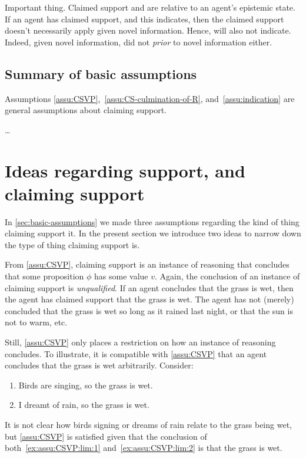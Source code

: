 \begin{note}
  \color{red}
  Important thing.
  Claimed support and  are relative to an agent's epistemic state.
  If an agent has claimed support, and this indicates, then the claimed support doesn't necessarily apply given novel information.
  Hence, will also not indicate.
  Indeed, given novel information, did not \indicateN{} \emph{prior} to novel information either.
\end{note}

\subsection{Summary of basic assumptions}
\label{sec:summary}

\begin{note}
  Assumptions \ref{assu:CSVP},~\ref{assu:CS-culmination-of-R}, and~\ref{assu:indication} are general assumptions about claiming support.

\color{red} \dots
\end{note}

\section{Ideas regarding support, and claiming support}
\label{sec:two-ideas}

\begin{note}
    In \ref{sec:basic-assumptions} we made three assumptions regarding the kind of thing claiming support it.
  In the present section we introduce two ideas to narrow down the type of thing claiming support is.
\end{note}

\begin{note}
  From \autoref{assu:CSVP}, claiming support is an instance of reasoning that concludes that some proposition \(\phi\) has some value \(v\).
  Again, the conclusion of an instance of claiming support is \emph{unqualified}.
  If an agent concludes that the grass is wet, then the agent has claimed support that the grass is wet.
  The agent has not (merely) concluded that the grass is wet so long as it rained last night, or that the sun is not to warm, etc.\

  Still, \autoref{assu:CSVP} only places a restriction on how an instance of reasoning concludes.
  To illustrate, it is compatible with \autoref{assu:CSVP} that an agent concludes that the grass is wet arbitrarily.
  Consider:
  \begin{enumerate}
  \item\label{ex:assu:CSVP:lim:1} Birds are singing, so the grass is wet.
  \item\label{ex:assu:CSVP:lim:2} I dreamt of rain, so the grass is wet.
  \end{enumerate}
  It is not clear how birds signing or dreams of rain relate to the grass being wet, but \autoref{assu:CSVP} is satisfied given that the conclusion of both~\ref{ex:assu:CSVP:lim:1} and~\ref{ex:assu:CSVP:lim:2} is that the grass is wet.
\end{note}

